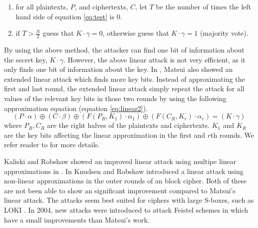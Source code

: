 \begin{enumerate}
	
	\item for all plaintexts, $P$, and ciphertexts, $C$, let $T$ be the number of times the left hand side of equation \ref{eq:test} is 0.
	\item if $T > \frac{N}{2}$ guess that $K \cdot \gamma = 0$, otherwise guess that $K \cdot \gamma = 1$ (majority vote).
	
\end{enumerate}
By using the above method, the attacker can find one bit of information about the secret key, $K \cdot \gamma$. However, the above linear attack is not very efficient, as it only finds one bit of information about the key. In \cite{matsui1994linear}, Matsui also showed an extended linear attack which finds more key bits. Instead of approximating the first and last round, the extended linear attack simply repeat the attack for all values of the relevant key bits in those two rounds by using the following approximation equation (equation \ref{eq:linear2}). 
\begin{equation} \label{eq:linear2}
(P \cdot \alpha) \oplus (C \cdot \beta) \oplus (F(P_{R},K_{1}) \cdot \alpha_{1}) \oplus (F(C_{R},K_{r}) \cdot \alpha_{r}) = (K \cdot \gamma)
\end{equation}
where $P_{R}, C_{R}$ are the right halves of the plaintexts and ciphertexts. $K_{1}$ and $K_{R}$ are the key bits affecting the linear approximation in the first and $r$th rounds. We refer reader to \cite{matsui1994linear} for more details.


Kaliski and Robshaw showed an improved linear attack using multipe linear approximations in \cite{kaliski1994linear}. In \cite{kilian1996protect} Knudsen and Robshaw introduced a linear attack using non-linear approximations in the outer rounds of an block cipher. Both of these are not been able to show an significant improvement compared to Matsui's linear attack. The attacks seem best suited for ciphers with large S-boxes, such as LOKI \cite{brown1990loki} \cite{kilian1996protect}. In 2004, new attacks were introduced to attack Feistel schemes in \cite{courtois2004feistel} which have a small improvements than Matsui's work.

